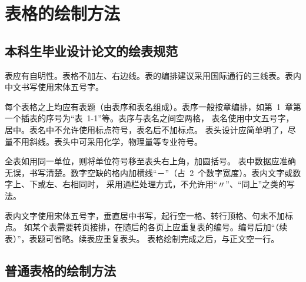 
\chapter{表格的绘制方法}

\section{本科生毕业设计论文的绘表规范}

表应有自明性。表格不加左、右边线。表的编排建议采用国际通行的三线表。表内中文书写使用宋体五号字。

每个表格之上均应有表题（由表序和表名组成）。表序一般按章编排，如第~1~章第一个插表的序号为“表~1-1”等。表序与表名之间空两格，
表名使用中文五号字，居中。表名中不允许使用标点符号，表名后不加标点。
表头设计应简单明了，尽量不用斜线。表头中可采用化学，物理量等专业符号。

全表如用同一单位，则将单位符号移至表头右上角，加圆括号。
表中数据应准确无误，书写清楚。数字空缺的格内加横线“－”（占~2~个数字宽度）。表内文字或数字上、下或左、右相同时，
采用通栏处理方式，不允许用“〃”、“同上”之类的写法。

表内文字使用宋体五号字，垂直居中书写，起行空一格、转行顶格、句末不加标点。
如某个表需要转页接排，在随后的各页上应重复表的编号。编号后加“（续表）”，表题可省略。续表应重复表头。
表格绘制完成之后，与正文空一行。

\section{普通表格的绘制方法}

